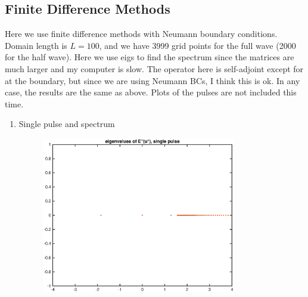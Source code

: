 \documentclass[12pt]{article}
\begin{document}
\subsection*{Finite Difference Methods}
Here we use finite difference methods with Neumann boundary conditions. Domain length is $L = 100$, and we have 3999 grid points for the full wave (2000 for the half wave). Here we use eigs to find the spectrum since the matrices are much larger and my computer is slow. The operator here is self-adjoint except for at the boundary, but since we are using Neumann BCs, I think this is ok. In any case, the results are the same as above. Plots of the pulses are not included this time.

\begin{enumerate}
	\item Single pulse and spectrum
	\begin{figure}[H]
	\includegraphics[width=8.5cm]{FDintEigs1.eps}
	\end{figure}


\end{enumerate}
\end{document}
